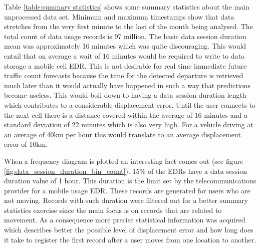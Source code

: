 \documentclass[12pt, a4paper]{report}
\theoremstyle{definition}
\theoremstyle{definition}%
\theoremstyle{definition}%
\theoremstyle{definition}%
\theoremstyle{definition}%
\theoremstyle{definition}%
\begin{document}
Table \ref{table:summary statistics} shows some summary statistics about the main unprocessed data set. Minimum and maximum timestamps show that data stretches from the very first minute to the last of the month being analysed. The total count of data usage records is 97 million. The basic data session duration  mean was approximately 16 minutes which was quite discouraging. This would entail that on average a wait of 16 minutes would be required to write to data storage a mobile cell EDR. This is not desirable for real time immediate future traffic count forecasts because the time for the detected departure is retrieved much later than it would actually have happened in such a way that predictions become useless. This would boil down to having a data session duration length which contributes to a considerable displacement error. Until the user connects to the next cell there is a distance covered within the average of 16 minutes and a standard deviation of 22 minutes which is also very high. For a vehicle driving at an average of 40km per hour this would translate to an average displacement error of 10km. 


\begin{table}[h]
	\label{table:summary statistics}
	\centering
	\caption{Basic summary statistics of main EDR dataset.} 
\end{table}


When a frequency diagram is plotted an interesting fact comes out (see figure \ref{fig:data_session_duration_bin_count}). 15\% of the EDRs have a data session duration value of 1 hour. This duration is the limit set by the telecommunications provider for a mobile usage EDR. These records are generated for users who are not moving. Records with such duration were filtered out for a better summary statistics exercise since the main focus is on records that are related to movement. As a consequence more precise statistical information was acquired which describes better the possible level of displacement error and how long does it take to register the first record after a user moves from one location to another.
\end{document}
